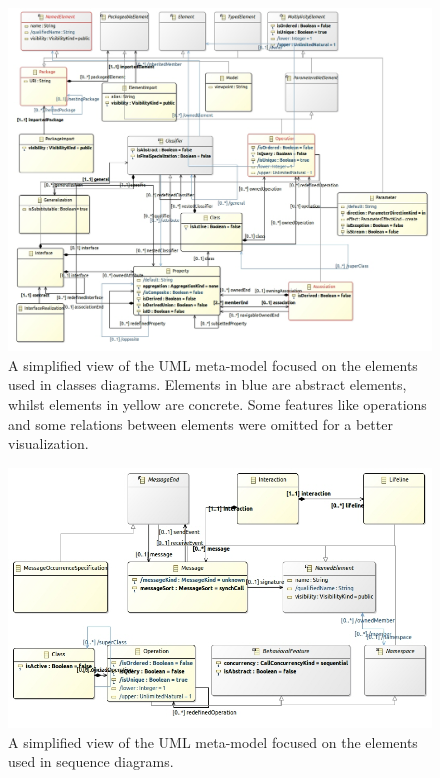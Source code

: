 \documentclass[tuberlin,cic,tc,english,noabntcite]{iiufrgs}
\begin{document}
\begin{figure}[h]
    \caption{A simplified view of the UML meta-model focused on the elements used in classes diagrams. Elements in blue are abstract elements, whilst elements in yellow are concrete. Some features like operations and some relations between elements were omitted for a better visualization.}
    \begin{center}
        \includegraphics[width=40em]{uml_metamodel_class}
    \end{center}
    \label{fig:uml_metamodel_class}
\end{figure}
\begin{figure}[h]
    \caption{A simplified view of the UML meta-model focused on the elements used in sequence diagrams.}
    \begin{center}
        \includegraphics[width=40em]{uml_metamodel_sequence}
    \end{center}
    \label{fig:uml_metamodel_sequence}
\end{figure}
\end{document}
